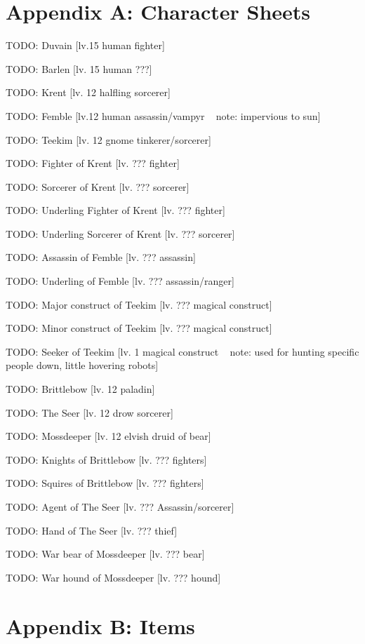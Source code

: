 \documentclass[10pt,twoside,twocolumn]{article}
\begin{document}
\section{Appendix A: Character Sheets}
TODO: Duvain [lv.15 human fighter]

TODO: Barlen [lv. 15 human ???]

TODO: Krent [lv. 12 halfling sorcerer]

TODO: Femble [lv.12 human assassin/vampyr ~ note: impervious to sun]

TODO: Teekim [lv. 12 gnome tinkerer/sorcerer]

TODO: Fighter of Krent [lv. ??? fighter]

TODO: Sorcerer of Krent [lv. ??? sorcerer]

TODO: Underling Fighter of Krent [lv. ??? fighter]

TODO: Underling Sorcerer of Krent [lv. ??? sorcerer]

TODO: Assassin of Femble [lv. ??? assassin]

TODO: Underling of Femble [lv. ??? assassin/ranger]

TODO: Major construct of Teekim [lv. ??? magical construct]

TODO: Minor construct of Teekim [lv. ??? magical construct]

TODO: Seeker of Teekim [lv. 1 magical construct ~ note: used for hunting specific people down, little hovering robots]

TODO: Brittlebow [lv. 12 paladin]

TODO: The Seer [lv. 12 drow sorcerer]

TODO: Mossdeeper [lv. 12 elvish druid of bear]

TODO: Knights of Brittlebow [lv. ??? fighters]

TODO: Squires of Brittlebow [lv. ??? fighters]

TODO: Agent of The Seer [lv. ??? Assassin/sorcerer]

TODO: Hand of The Seer [lv. ??? thief]

TODO: War bear of Mossdeeper [lv. ??? bear]

TODO: War hound of Mossdeeper [lv. ??? hound]

\clearpage

\section{Appendix B: Items}
\end{document}
